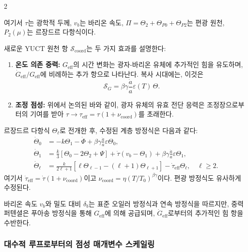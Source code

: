 \documentclass[11pt,a4paper]{article}
\begin{document}
	\begin{multicols}{2}
		
		\noindent 여기서 $\tau$는 광학적 두께, $v_b$는 바리온 속도, $\Pi = \Theta_2 + \Theta_{P0} + \Theta_{P2}$는 편광 원천, $P_2(\mu)$는 르장드르 다항식이다.
		
		새로운 YUCT 원천 항 $\mathcal{S}_{\mathrm{coord}}$는 두 가지 효과를 설명한다:
		\begin{enumerate}
			\item \textbf{온도 의존 중력:} $G_{\mathrm{eff}}$의 시간 변화는 광자-바리온 유체에 추가적인 힘을 유도하며, $\dot{G}_{\mathrm{eff}}/G_{\mathrm{eff}}$에 비례하는 추가 항으로 나타난다. 복사 시대에는, 이것은
			\begin{equation}
				\mathcal{S}_G = \beta\gamma \frac{\dot{a}}{a} \varepsilon(T) \, \Theta.
			\end{equation}
			\item \textbf{조정 점성:} 위에서 논의된 바와 같이, 광자 유체의 유효 전단 응력은 조정장으로부터의 기여를 받아 $\tau \to \tau_{\mathrm{eff}} = \tau (1 + \nu_{\mathrm{coord}})$를 초래한다.
		\end{enumerate}
		
		르장드르 다항식 $\Theta_\ell$로 전개한 후, 수정된 계층 방정식은 다음과 같다:
		\begin{align}
			\dot{\Theta}_0 &= -k\Theta_1 - \dot{\Phi} + \beta\gamma \frac{\dot{a}}{a} \varepsilon \Theta_0, \label{eq:hier0}\\
			\dot{\Theta}_1 &= \frac{k}{3}\left[\Theta_0 - 2\Theta_2 + \Psi\right] + \dot{\tau}(v_b - \Theta_1) + \beta\gamma \frac{\dot{a}}{a} \varepsilon \Theta_1, \label{eq:hier1}\\
			\dot{\Theta}_\ell &= \frac{k}{2\ell+1}\left[\ell\Theta_{\ell-1} - (\ell+1)\Theta_{\ell+1}\right] - \dot{\tau}_{\mathrm{eff}}\Theta_\ell, \quad \ell \ge 2. \label{eq:hier_ell}
		\end{align}
		여기서 $\dot{\tau}_{\mathrm{eff}} = \dot{\tau}(1 + \nu_{\mathrm{coord}})$이고 $\nu_{\mathrm{coord}} = \eta (T/T_0)^{\beta\gamma}$이다. 편광 방정식도 유사하게 수정된다.
		
		바리온 속도 $v_b$와 밀도 대비 $\delta_b$는 표준 오일러 방정식과 연속 방정식을 따르지만, 중력 퍼텐셜은 푸아송 방정식을 통해 $G_{\mathrm{eff}}$에 의해 공급되며, $\dot{G}_{\mathrm{eff}}$로부터의 추가적인 힘 항을 수반한다.
		
		\subsubsection{대수적 루프로부터의 점성 매개변수 스케일링}
		\label{subsubsec:viscosity_scaling}
		

\end{multicols}
\end{document}
